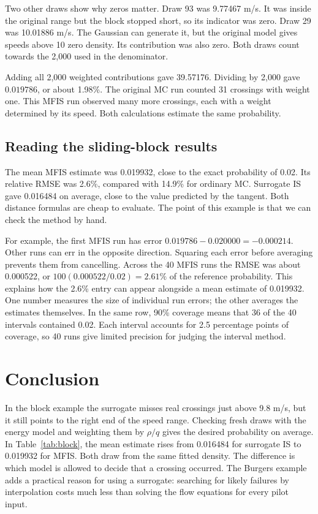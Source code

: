 \documentclass[11pt,a4paper]{article}
\begin{document}
Two other draws show why zeros matter. Draw 93 was 9.77467 m/s. It was inside the original range but the block stopped short, so its indicator was zero. Draw 29 was 10.01886 m/s. The Gaussian can generate it, but the original model gives speeds above 10 zero density. Its contribution was also zero. Both draws count towards the 2,000 used in the denominator.

Adding all 2,000 weighted contributions gave 39.57176. Dividing by 2,000 gave $0.019786$, or about 1.98\%. The original MC run counted 31 crossings with weight one. This MFIS run observed many more crossings, each with a weight determined by its speed. Both calculations estimate the same probability.

\subsection{Reading the sliding-block results}
\begin{table}[H]\centering\small

\caption{Sliding-block estimates over 40 runs of 2,000 production draws each. The exact reference probability is 0.02.}\label{tab:block}
\end{table}

The mean MFIS estimate was 0.019932, close to the exact probability of 0.02. Its relative RMSE was 2.6\%, compared with 14.9\% for ordinary MC. Surrogate IS gave 0.016484 on average, close to the value predicted by the tangent. Both distance formulas are cheap to evaluate. The point of this example is that we can check the method by hand.


For example, the first MFIS run has error $0.019786-0.020000=-0.000214$. Other runs can err in the opposite direction. Squaring each error before averaging prevents them from cancelling. Across the 40 MFIS runs the RMSE was about 0.000522, or $100(0.000522/0.02)=2.61\%$ of the reference probability. This explains how the 2.6\% entry can appear alongside a mean estimate of 0.019932. One number measures the size of individual run errors; the other averages the estimates themselves. In the same row, 90\% coverage means that 36 of the 40 intervals contained 0.02. Each interval accounts for 2.5 percentage points of coverage, so 40 runs give limited precision for judging the interval method.

\section{Conclusion}
In the block example the surrogate misses real crossings just above 9.8 m/s, but it still points to the right end of the speed range. Checking fresh draws with the energy model and weighting them by $\rho/q$ gives the desired probability on average. In Table~\ref{tab:block}, the mean estimate rises from 0.016484 for surrogate IS to 0.019932 for MFIS. Both draw from the same fitted density. The difference is which model is allowed to decide that a crossing occurred. The Burgers example adds a practical reason for using a surrogate: searching for likely failures by interpolation costs much less than solving the flow equations for every pilot input.
\end{document}
